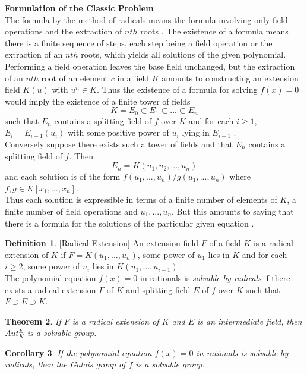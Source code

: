 \documentclass[11pt]{amsart}
\theoremstyle{plain}
\newtheorem{theorem}{Theorem}[section]
\newtheorem{corollary}[theorem]{Corollary}
\theoremstyle{definition}
\newtheorem{definition}[theorem]{Definition}
\numberwithin{equation}{section}
\begin{document}
\textbf{Formulation of the Classic Problem}\\
The formula by the method of radicals means the formula involving only field operations and the extraction of \(nth\) roots \cite{hunger}.
The existence of a formula means there is a finite sequence of steps, each step being a field operation or the extraction of an \(nth\) roots, which yields all solutions of the given polynomial.
Performing a field operation leaves the base field unchanged, but the extraction of an \(nth\) root of an element
\(c\) in a field \(K\) amounts to constructing an extension field \(K(u)\) with \(u^n \in K\). Thus the existence of a formula for solving \(f(x)=0\) would imply
the existence of a finite tower of fields
\[K=E_0 \subset E_1 \subset ... \subset E_n\]
such that \(E_n\) contains a splitting field of \(f\) over \(K\) and for each \(i \geq 1\), \(E_i=E_{i-1}(u_i)\) with some positive power of \(u_i\) lying in \(E_{i-1}\) \cite{hunger}.\\
Conversely suppose there exists such a tower of fields and that \(E_n\) contains a splitting field of \(f\). Then
\[E_n = K(u_1,u_2,...,u_n)\]
and each solution is of the form \(f(u_1,...,u_n)/g(u_1,...,u_n)\) where \(f,g \in K[x_1,...,x_n]\). \\
Thus each solution is expressible in terms of a finite number of elements of \(K\), a finite number of field operations and \(u_1,...,u_n\). But
this amounts to saying that there is a formula for the solutions of the particular given equation \cite{hunger}. \\

\begin{definition} \cite{hunger} [Radical Extension]
  An extension field \(F\) of a field \(K\) is a radical extension of \(K\) if \(F=K(u_1,...,u_n)\), some power of \(u_1\) lies in \(K\) and for each \(i \geq 2\), some power of \(u_i\) lies in \(K(u_1,...,u_{i-1})\).\\
  The polynomial equation \(f(x)=0\) in rationals is \textit{solvable by radicals} if there exists a radical extension \(F\) of \(K\) and splitting field \(E\) of \(f\) over \(K\) such that \(F \supset E \supset K\).
\end{definition}

\begin{theorem} \cite{hunger}
If \(F\) is a radical extension of \(K\) and \(E\) is an intermediate field, then \(Aut_K^E\) is a solvable group.
\end{theorem}

\begin{corollary} \cite{hunger}
If the polynomial equation \(f(x)=0\) in rationals is solvable by radicals, then the Galois group of \(f\) is a solvable group.\\
\end{corollary}
\end{document}
